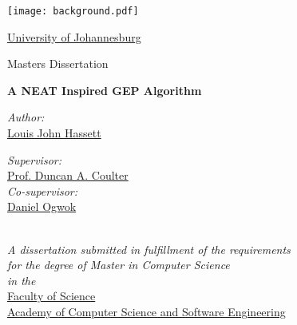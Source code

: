 \documentclass[
	12pt, %
	fleqn, %
	a4paper, %
]{LegrandOrangeBook}
\begin{document}

\titlepage %
	{\texttt{[image: background.pdf]}} %
	{ %
		\centering\sffamily %
		{\LARGE \href{https://www.uj.ac.za/}{University of Johannesburg}\par} %
		\vspace{16pt}
		{\large Masters Dissertation\par} %
		\vspace{16pt} %
		{\Huge\bfseries A NEAT Inspired GEP Algorithm\par} %
		\vspace{16pt} %

		\begin{minipage}[t]{0.4\textwidth}
		\begin{flushleft} \large
		\emph{Author:}\\
		\href{http://www.johnsmith.com}{Louis John Hassett} %
		\end{flushleft}
		\end{minipage}
		\begin{minipage}[t]{0.4\textwidth}
		\begin{flushright} \large
		\emph{Supervisor:} \\
		\href{http://www.jamessmith.com}{Prof. Duncan A. Coulter} \\ %
		\emph{Co-supervisor:} \\
		\href{http://www.jamessmith.com}{Daniel Ogwok}
		\end{flushright}
		\end{minipage}\\[1cm]

		\large \textit{A dissertation submitted in fulfillment of the requirements\\ for the degree of Master in Computer Science}\\[0.3cm] %
		\textit{in the}\\[0.4cm]
		\href{https://adam.uj.ac.za/academy/}{Faculty of Science\\Academy of Computer Science and Software Engineering}\\ %
	}
\end{document}
